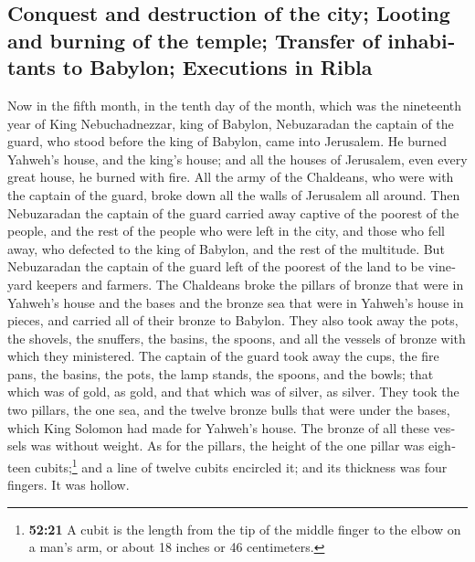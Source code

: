 \begin{paracol}{2}
\begin{otherlanguage}{english}
\hypertarget{conquest-and-destruction-of-the-city-looting-and-burning-of-the-temple-transfer-of-inhabitants-to-babylon-executions-in-ribla}{%
\subsection{Conquest and destruction of the city; Looting and burning of
the temple; Transfer of inhabitants to Babylon; Executions in
Ribla}\label{conquest-and-destruction-of-the-city-looting-and-burning-of-the-temple-transfer-of-inhabitants-to-babylon-executions-in-ribla}}

 Now in the fifth month, in the tenth day of the month,
which was the nineteenth year of King Nebuchadnezzar, king of Babylon,
Nebuzaradan the captain of the guard, who stood before the king of
Babylon, came into Jerusalem.  He burned Yahweh's house,
and the king's house; and all the houses of Jerusalem, even every great
house, he burned with fire.  All the army of the
Chaldeans, who were with the captain of the guard, broke down all the
walls of Jerusalem all around.  Then Nebuzaradan the
captain of the guard carried away captive of the poorest of the people,
and the rest of the people who were left in the city, and those who fell
away, who defected to the king of Babylon, and the rest of the
multitude.  But Nebuzaradan the captain of the guard left
of the poorest of the land to be vineyard keepers and farmers.
 The Chaldeans broke the pillars of bronze that were in
Yahweh's house and the bases and the bronze sea that were in Yahweh's
house in pieces, and carried all of their bronze to Babylon.
 They also took away the pots, the shovels, the snuffers,
the basins, the spoons, and all the vessels of bronze with which they
ministered.  The captain of the guard took away the cups,
the fire pans, the basins, the pots, the lamp stands, the spoons, and
the bowls; that which was of gold, as gold, and that which was of
silver, as silver.  They took the two pillars, the one
sea, and the twelve bronze bulls that were under the bases, which King
Solomon had made for Yahweh's house. The bronze of all these vessels was
without weight.  As for the pillars, the height of the
one pillar was eighteen cubits;\footnote{\textbf{52:21} A cubit is the
  length from the tip of the middle finger to the elbow on a man's arm,
  or about 18 inches or 46 centimeters.} and a line of twelve cubits
encircled it; and its thickness was four fingers. It was hollow.

\end{otherlanguage}
\end{paracol}
